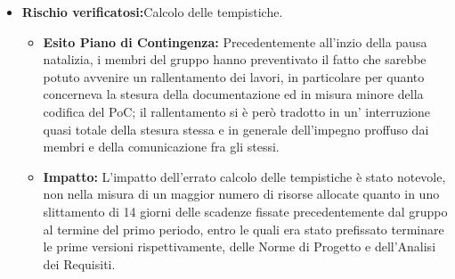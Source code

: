 \begin{itemize}
\item \textbf{Rischio verificatosi:}Calcolo delle tempistiche.
\begin{itemize}
    \item \textbf{Esito Piano di Contingenza:} Precedentemente all'inzio della pausa natalizia, i membri del gruppo hanno preventivato il fatto che sarebbe potuto avvenire
    un rallentamento dei lavori, in particolare per quanto concerneva la stesura della documentazione ed in misura minore della codifica del PoC;
    il rallentamento si è però tradotto in un' interruzione quasi totale della stesura stessa e in generale dell'impegno proffuso dai membri e della comunicazione
    fra gli stessi.
    \item \textbf{Impatto:} L'impatto dell'errato calcolo delle tempistiche è stato notevole, non nella misura di un maggior numero di risorse allocate quanto in uno slittamento
    di 14 giorni delle scadenze fissate precedentemente dal gruppo al termine del primo periodo, entro le quali era stato prefissato terminare le prime versioni rispettivamente,
    delle Norme di Progetto e dell'Analisi dei Requisiti.
\end{itemize}
\end{itemize}

